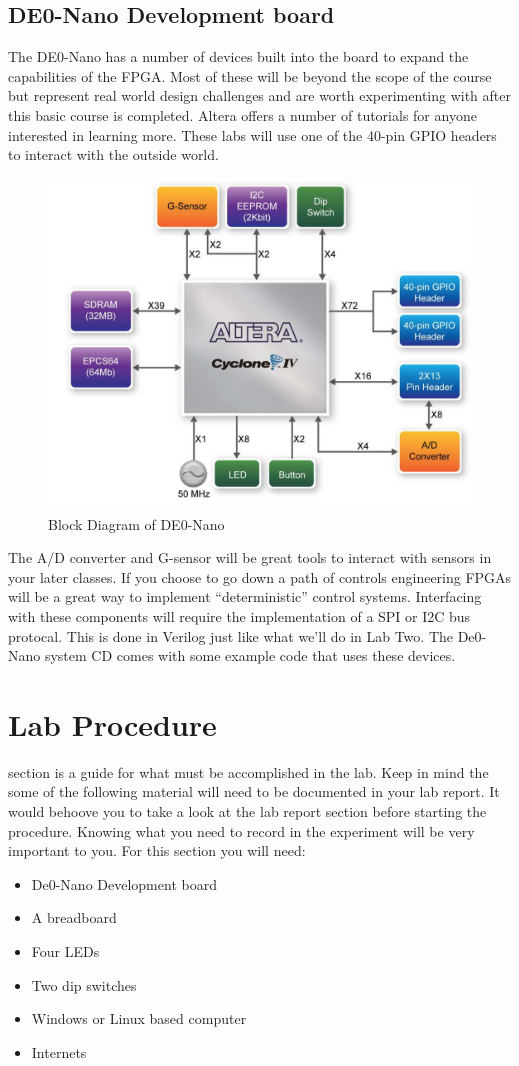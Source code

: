 \documentclass[12pt,journal]{IEEEtran}
\begin{document}
    \subsection{DE0-Nano Development board}
      The DE0-Nano has a number of devices built into the board to expand the capabilities of the FPGA. Most of these will be beyond the scope of the course but represent real world design challenges and are worth experimenting with after this basic course is completed. Altera offers a number of tutorials for anyone interested in learning more. These labs will use one of the 40-pin GPIO headers to interact with the outside world. 
      \begin{figure}[H]
        \includegraphics[width=.48\textwidth]{Images/DEONanoBlockDiagram.png}
        \caption{Block Diagram of DE0-Nano \cite{DE0Manual}}
      \end{figure}
      The A/D converter and G-sensor will be great tools to interact with sensors in your later classes. If you choose to go down a path of controls engineering FPGAs will be a great way to implement ``deterministic'' control systems. Interfacing with these components will require the implementation of a SPI or I2C bus protocal. This is done in Verilog just like what we'll do in Lab Two. The De0-Nano system CD comes with some example code that uses these devices. 
      \clearpage

  \section{Lab Procedure}
     section is a guide for what must be accomplished in the lab. Keep in mind the some of the following material will need to be documented in your lab report. It would behoove you to take a look at the lab report section before starting the procedure. Knowing what you need to record in the experiment will be very important to you. For this section you will need:
    \begin{itemize}
      \item De0-Nano Development board
      \item A breadboard
      \item Four LEDs
      \item Two dip switches
      \item Windows or Linux based computer
      \item Internets
    \end{itemize}
\end{document}
